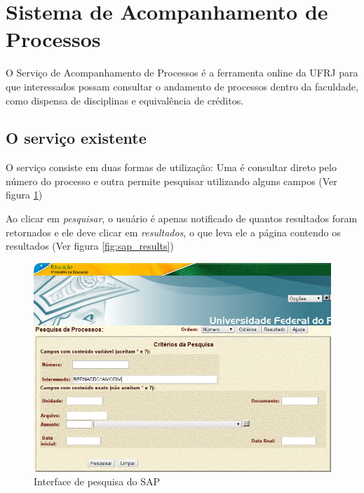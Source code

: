\section{Sistema de Acompanhamento de Processos}
O Serviço de Acompanhamento de Processos é a ferramenta online da UFRJ para que interessados possam consultar o andamento de processos dentro da faculdade, como dispensa de disciplinas e equivalência de créditos.

\subsection{O serviço existente}

O serviço consiste em duas formas de utilização: Uma é consultar direto pelo número do processo e outra permite pesquisar utilizando alguns campos (Ver figura \ref{fig:sap_pesquisa})

Ao clicar em \textit{pesquisar}, o usuário é apenas notificado de quantos resultados foram retornados e ele deve clicar em \textit{resultados}, o que leva ele a página contendo os resultados (Ver figura \ref{fig:sap_results})

\begin{figure}[!hp]
  \centering
    \includegraphics[width=\textwidth]{sap_pesquisa.png}
  \caption{Interface de pesquisa do SAP}
  \label{fig:sap_pesquisa}
\end{figure}

